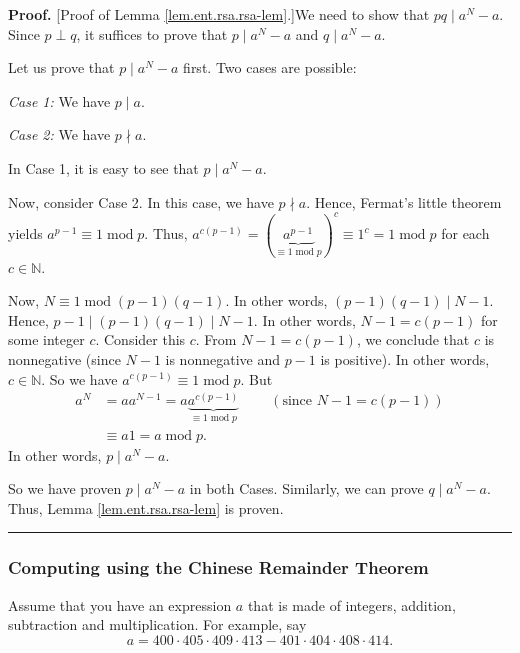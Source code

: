 \documentclass[numbers=enddot,12pt,final,onecolumn,notitlepage]{scrartcl}%
\numberwithin{exer}{subsection}
\theoremstyle{definition}
\newenvironment{proof}[1][Proof]{\noindent\textbf{#1.} }{\ \rule{0.5em}{0.5em}}
\begin{document}
\begin{proof}
[Proof of Lemma \ref{lem.ent.rsa.rsa-lem}.]We need to show that $pq\mid
a^{N}-a$. Since $p\perp q$, it suffices to prove that $p\mid a^{N}-a$ and
$q\mid a^{N}-a$.

Let us prove that $p\mid a^{N}-a$ first. Two cases are possible:

\textit{Case 1:} We have $p\mid a$.

\textit{Case 2:} We have $p\nmid a$.

In Case 1, it is easy to see that $p\mid a^{N}-a$.

Now, consider Case 2. In this case, we have $p\nmid a$. Hence, Fermat's little
theorem yields $a^{p-1}\equiv1\operatorname{mod}p$. Thus, $a^{c\left(
p-1\right)  }=\left(  \underbrace{a^{p-1}}_{\equiv1\operatorname{mod}%
p}\right)  ^{c}\equiv1^{c}=1\operatorname{mod}p$ for each $c\in\mathbb{N}$.

Now, $N\equiv1\operatorname{mod}\left(  p-1\right)  \left(  q-1\right)  $. In
other words, $\left(  p-1\right)  \left(  q-1\right)  \mid N-1$. Hence,
$p-1\mid\left(  p-1\right)  \left(  q-1\right)  \mid N-1$. In other words,
$N-1=c\left(  p-1\right)  $ for some integer $c$. Consider this $c$. From
$N-1=c\left(  p-1\right)  $, we conclude that $c$ is nonnegative (since $N-1$
is nonnegative and $p-1$ is positive). In other words, $c\in\mathbb{N}$. So we
have $a^{c\left(  p-1\right)  }\equiv1\operatorname{mod}p$. But
\begin{align*}
a^{N} &  =aa^{N-1}=a\underbrace{a^{c\left(  p-1\right)  }}_{\equiv
1\operatorname{mod}p}\ \ \ \ \ \ \ \ \ \ \left(  \text{since }N-1=c\left(
p-1\right)  \right)  \\
&  \equiv a1=a\operatorname{mod}p.
\end{align*}
In other words, $p\mid a^{N}-a$.

So we have proven $p\mid a^{N}-a$ in both Cases. Similarly, we can prove
$q\mid a^{N}-a$. Thus, Lemma \ref{lem.ent.rsa.rsa-lem} is proven.
\end{proof}

\subsubsection{Computing using the Chinese Remainder Theorem}

Assume that you have an expression $a$ that is made of integers, addition,
subtraction and multiplication. For example, say%
\[
a=400\cdot405\cdot409\cdot413-401\cdot404\cdot408\cdot414.
\]
\end{document}
